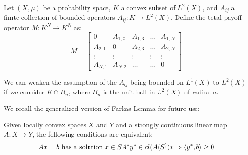 \begin{definition}
  \label{def:total_payoff}
  Let $(X,\mu)$ be a probability space, $K$ a convex subset of $L^2(X)$, and $A_{ij}$ a finite collection of bounded operators $A_{ij}: K \to L^2(X)$. Define the total payoff operator $M:K^N \to K^N$ as:
  \begin{equation}
    M =
    \begin{bmatrix}
        0 & A_{1,2} & A_{1,3} &\dots & A_{1,N} \\
        A_{2,1} & 0 & A_{2,3} &\dots & A_{2,N} \\
        \vdots & \vdots & \vdots & \vdots & \vdots \\
        A_{N,1} & A_{N,2} & \dots & \dots & 0
    \end{bmatrix}
  \end{equation}
\end{definition}
\begin{remark}
  We can weaken the assumption of the $A_{ij}$ being bounded on $L^1(X)$ to $L^2(X)$ if we consider $K\cap B_n$, where $B_n$ is the unit ball in $L^2(X)$ of radius $n$.
\end{remark}
We recall the generalized version of Farkas Lemma for future use:
\begin{lemma}
  \label{lem:farkas_lemma}
Given locally convex spaces $X$ and $Y$ and a strongly continuous linear map $A:X\to Y$, the following conditions are equivalent:
  \begin{align}
    Ax = b \text{ has a solution } x\in S
    A^* y^* \in cl(A(S^))* \Rightarrow \left \langle y^*,b \right \rangle \geq 0
  \end{align}
\end{lemma}

